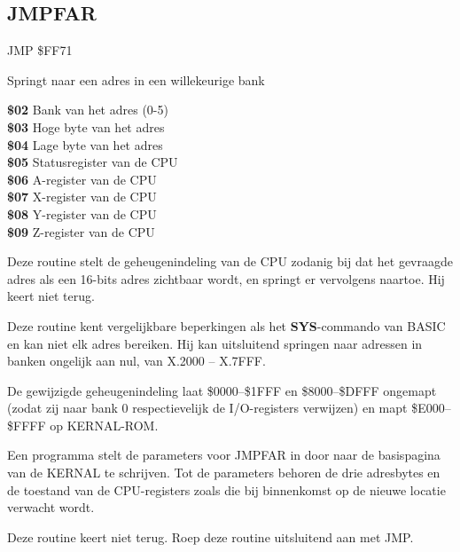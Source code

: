 \subsection{JMPFAR}
\label{KERNAL Jump Table!JMPFAR}
\begin{description}[leftmargin=2cm,style=nextline]
    \item [Adres:] JMP \$FF71    \item [Omschrijving:] Springt naar een adres in een willekeurige bank    \item [Invoer:]        \textbf{\$02} Bank van het adres (0-5) \\        \textbf{\$03} Hoge byte van het adres \\        \textbf{\$04} Lage byte van het adres \\        \textbf{\$05} Statusregister van de CPU \\        \textbf{\$06} A-register van de CPU \\        \textbf{\$07} X-register van de CPU \\        \textbf{\$08} Y-register van de CPU \\        \textbf{\$09} Z-register van de CPU    \item [Opmerkingen:]        Deze routine stelt de geheugenindeling van de CPU zodanig bij dat het gevraagde adres als een 16-bits adres zichtbaar wordt, en springt er vervolgens naartoe. Hij keert niet terug.

        Deze routine kent vergelijkbare beperkingen als het \textbf{SYS}-commando van BASIC en kan niet elk adres bereiken. Hij kan uitsluitend springen naar adressen in banken ongelijk aan nul, van X.2000 -- X.7FFF.

        De gewijzigde geheugenindeling laat \$0000--\$1FFF en \$8000--\$DFFF ongemapt (zodat zij naar bank 0 respectievelijk de I/O-registers verwijzen) en mapt \$E000--\$FFFF op KERNAL-ROM.

        Een programma stelt de parameters voor JMPFAR in door naar de basispagina van de KERNAL te schrijven. Tot de parameters behoren de drie adresbytes en de toestand van de CPU-registers zoals die bij binnenkomst op de nieuwe locatie verwacht wordt.

        Deze routine keert niet terug. Roep deze routine uitsluitend aan met JMP.    \item [Voorbeeld:]
\end{description}



